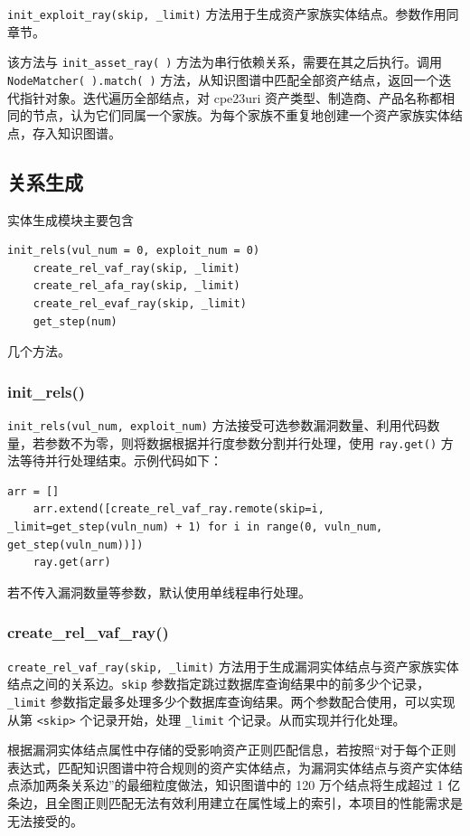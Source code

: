\documentclass[a4paper,AutoFakeBold,oneside,12pt]{book}
\begin{document}
\lstinline|init_exploit_ray(skip, _limit)| 方法用于生成资产家族实体结点。参数作用同  章节。

该方法与 \lstinline|init_asset_ray( )| 方法为串行依赖关系，需要在其之后执行。调用 \lstinline|NodeMatcher( ).match( )| 方法，从知识图谱中匹配全部资产结点，返回一个迭代指针对象。迭代遍历全部结点，对 cpe23uri 资产类型、制造商、产品名称都相同的节点，认为它们同属一个家族。为每个家族不重复地创建一个资产家族实体结点，存入知识图谱。

\subsection{关系生成}

实体生成模块主要包含
\begin{lstlisting}[style = python]
	init_rels(vul_num = 0, exploit_num = 0)
	create_rel_vaf_ray(skip, _limit)
	create_rel_afa_ray(skip, _limit)
	create_rel_evaf_ray(skip, _limit)
	get_step(num)
\end{lstlisting}
几个方法。

\subsubsection{init{\_}rels()}

\lstinline|init_rels(vul_num, exploit_num)| 方法接受可选参数漏洞数量、利用代码数量，若参数不为零，则将数据根据并行度参数分割并行处理，使用 \lstinline|ray.get()| 方法等待并行处理结束。示例代码如下：
\begin{lstlisting}[style = python]
	arr = []
	arr.extend([create_rel_vaf_ray.remote(skip=i, _limit=get_step(vuln_num) + 1) for i in range(0, vuln_num, get_step(vuln_num))])
	ray.get(arr)
\end{lstlisting}

若不传入漏洞数量等参数，默认使用单线程串行处理。

\subsubsection{create{\_}rel{\_}vaf{\_}ray()}

\lstinline|create_rel_vaf_ray(skip, _limit)| 方法用于生成漏洞实体结点与资产家族实体结点之间的关系边。\lstinline|skip| 参数指定跳过数据库查询结果中的前多少个记录，\lstinline|_limit| 参数指定最多处理多少个数据库查询结果。两个参数配合使用，可以实现从第 \lstinline|<skip>| 个记录开始，处理 \lstinline|_limit| 个记录。从而实现并行化处理。

根据漏洞实体结点属性中存储的受影响资产正则匹配信息，若按照“对于每个正则表达式，匹配知识图谱中符合规则的资产实体结点，为漏洞实体结点与资产实体结点添加两条关系边”的最细粒度做法，知识图谱中的 120 万个结点将生成超过 1 亿条边，且全图正则匹配无法有效利用建立在属性域上的索引，本项目的性能需求是无法接受的。
\end{document}
